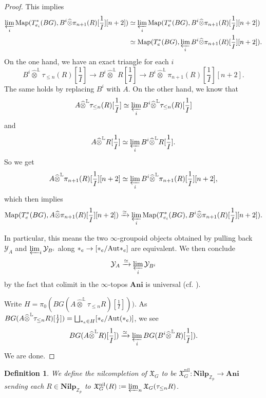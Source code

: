 \documentclass[10pt]{article}
\newtheorem{dfn}[thm]{Definition}
\numberwithin{equation}{section}
\newcommand{\frakX}{{\mathfrak X}}
\newcommand{\bL}{{\mathbb L}}
\newcommand{\bZ}{{\mathbb Z}}
\newcommand{\calY}{{\mathcal Y}}
\newcommand{\Map}{\mathrm{Map}}
\newcommand{\nil}{\mathrm{nil}}
\newcommand{\bfAni}{\textbf{Ani}}
\begin{document}
\begin{proof}
This implies
\begin{equation*}
    \begin{split}
        \varprojlim_i\Map(T^*_{e_i}(BG),B^i\widehat\otimes\pi_{n+1}(R)[\frac{1}{I}][n+2]) & \simeq \varprojlim_i\Map(T^*_e(BG),B^i\widehat\otimes\pi_{n+1}(R)[\frac{1}{I}][n+2])\\
        &\simeq \Map(T^*_e(BG),\varprojlim_iB^i\widehat\otimes\pi_{n+1}(R)[\frac{1}{I}][n+2]).
    \end{split}
\end{equation*}
On the one hand, we have an exact triangle for each $i$
\[
B^i\widehat\otimes^{\bL}\tau_{\leq n}(R)[\frac{1}{I}]\to B^i\widehat\otimes^{\bL}R[\frac{1}{I}]\to B^i\widehat\otimes^{\bL}\pi_{n+1}(R)[\frac{1}{I}][n+2].
\]
The same holds by replacing $B^i$ with $A$. On the other hand, we know that
\[
A\widehat\otimes^{\bL}\tau_{\leq n}(R)[\frac{1}{I}]\simeq \varprojlim_i B^i\widehat\otimes^{\bL}\tau_{\leq n}(R)[\frac{1}{I}]
\]
and
\[
A\widehat\otimes^{\bL}R[\frac{1}{I}]\simeq \varprojlim_i B^i\widehat\otimes^{\bL}R[\frac{1}{I}].
\]
So we get 
\[
A\widehat\otimes^{\bL}\pi_{n+1}(R)[\frac{1}{I}][n+2]\simeq \varprojlim_i B^i\widehat\otimes^{\bL}\pi_{n+1}(R)[\frac{1}{I}][n+2],
\]
which then implies
\[
\Map(T^*_e(BG),A\widehat\otimes\pi_{n+1}(R)[\frac{1}{I}][n+2])\xrightarrow{\simeq} \varprojlim_i\Map(T^*_{e_i}(BG),B^i\widehat\otimes\pi_{n+1}(R)[\frac{1}{I}][n+2]).
\]

In particular, this means the two $\infty$-groupoid objects obtained by pulling back $\calY_A$ and $\varprojlim_i\calY_{B^i}$ along $*_e\to [*_e/\mathrm{Aut}{*_e}]$ are equivalent. We then conclude
\[
\calY_A\xrightarrow{\simeq}\varprojlim_i\calY_{B^i}
\]
by the fact that colimit in the $\infty$-topos $\bfAni$ is universal (cf. \cite[Theorem 6.1.0.6]{Lur09a}).

Write $H=\pi_0(BG(A\widehat\otimes^{\bL} \tau_{\leq n}R)[\frac{1}{I}]))$. As $BG(A\widehat\otimes^{\bL} \tau_{\leq n}R)[\frac{1}{I}])=\bigsqcup_{*_e\in H}[*_e/\Aut(*_e)]$, we see
\[
BG(A\widehat\otimes^{\bL} R)[\frac{1}{I}])\xrightarrow{\simeq} \varprojlim_iBG(B^i\widehat\otimes^{\bL} R)[\frac{1}{I}]).
\]
We are done.

\end{proof}

\begin{dfn}
    We define the nilcompletion of $\frakX_G$ to be $\frakX_G^{\nil}:\textbf{Nilp}_{\bZ_p}\to \textbf{Ani}$ sending each $R\in \textbf{Nilp}_{\bZ_p}$ to $\frakX_G^{\nil}(R):=\varprojlim_n\frakX_G(\tau_{\leq n}R)$.
\end{dfn}
\end{document}
